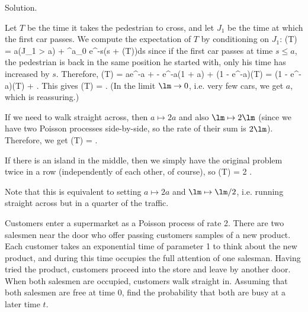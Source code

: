 
Solution. \ben
\item [(a)] Let $T$ be the time it takes the pedestrian to cross, and let $J_1$ be the time at which the first car passes. We compute the expectation of $T$ by conditioning on $J_1$: 
\be
\E(T) = a\pro(J_1 > a) + \int^a_0 \lm e^{-\lm s}(s + \E(T))ds
\ee
since if the first car passes at time $s \leq a$, the pedestrian is back in the same position he started with, only his time has increased by $s$. Therefore,
\be
\E(T) = ae^{-\lm a} +   - e^{-\lm a}(1 + \lm a) \rob + (1 - e^{-\lm a})\E(T) = (1 - e^{-\lm a})\lob \E(T) +  \rob.
\ee
This gives 
\be
\E(T) = .
\ee
(In the limit $\lm \to  0$, i.e. very few cars, we get $a$, which is reassuring.)

If we need to walk straight across, then $a \mapsto 2a$ and also $\lm \mapsto 2\lm$ (since we have two Poisson processes side-by-side, so the rate of their sum is $2\lm$). Therefore, we get 
\be
\E(T) = .
\ee

\item [(b)] If there is an island in the middle, then we simply have the original problem twice in a row (independently of each other, of course), so 
\be
\E(T) = 2 .
\ee

Note that this is equivalent to setting $a \mapsto 2a$ and $\lm \mapsto \lm/2$, i.e. running straight across but in a quarter of the traffic.
\een

\vspace{2mm}

\qcutline


\begin{exercise}
Customers enter a supermarket as a Poisson process of rate 2. There are two salesmen near the door who offer passing customers samples of a new product. Each customer takes an exponential time of parameter 1 to think about the new product, and during this time occupies the full attention of one salesman. Having tried the product, customers proceed into the store and leave by another door. When both salesmen are occupied, customers walk straight in. Assuming that both salesmen are free at time 0, find the probability that both are busy at a later time $t$.
\end{exercise}

